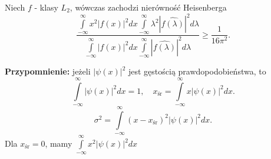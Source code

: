 \documentclass[../main.tex]{subfiles}
\begin{document}
    \pagebreak
    \begin{stw}
        Niech $f$ - klasy $L_2$, wówczas zachodzi nierówność Heisenberga
        \[
            \frac{\int\limits_{-\infty}^{\infty} x^2 \left| f(x) \right| ^2 dx \int\limits_{-\infty}^{\infty} \lambda^2 \left| \widehat{f(\lambda)} \right| ^2 d\lambda}{\int\limits_{-\infty}^{\infty} \left| f(x) \right| ^2 dx \int\limits_{-\infty}^{\infty} \left| \widehat{f(\lambda)} \right| ^2 d\lambda } \ge \frac{1}{16\pi^2}
        .\]
    \end{stw}
    \textbf{Przypomnienie:} jeżeli $\left| \psi(x) \right| ^2$ jest gęstością prawdopodobieństwa, to
    \[
        \int\limits_{-\infty}^{\infty} \left| \psi(x) \right| ^2 dx = 1,\quad x_{\text{śr}} = \int\limits_{-\infty}^{\infty}  x \left| \psi(x) \right| ^2 dx
    .\]
\[
    \sigma^2 = \int\limits_{-\infty}^{\infty} (x-x_{\text{śr}})^2 \left| \psi(x) \right| ^2 dx
.\]
Dla $x_{\text{śr}} = 0$, mamy $\int\limits_{-\infty}^{\infty} x^2 \left| \psi(x) \right| ^2 dx $
\end{document}
